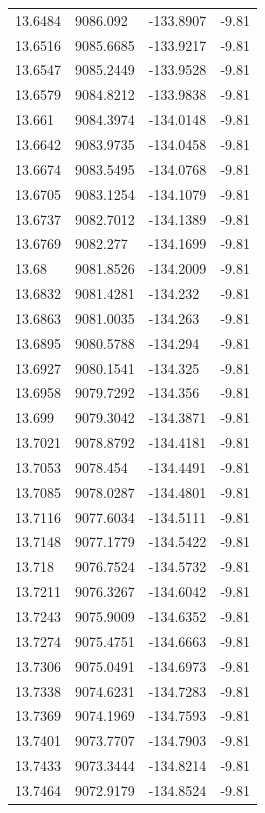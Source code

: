 \begin{table}[H]
\begin{tabular}{llll}
13.6484 & 9086.092 & -133.8907 & -9.81 \\
13.6516 & 9085.6685 & -133.9217 & -9.81 \\
13.6547 & 9085.2449 & -133.9528 & -9.81 \\
13.6579 & 9084.8212 & -133.9838 & -9.81 \\
13.661 & 9084.3974 & -134.0148 & -9.81 \\
13.6642 & 9083.9735 & -134.0458 & -9.81 \\
13.6674 & 9083.5495 & -134.0768 & -9.81 \\
13.6705 & 9083.1254 & -134.1079 & -9.81 \\
13.6737 & 9082.7012 & -134.1389 & -9.81 \\
13.6769 & 9082.277 & -134.1699 & -9.81 \\
13.68 & 9081.8526 & -134.2009 & -9.81 \\
13.6832 & 9081.4281 & -134.232 & -9.81 \\
13.6863 & 9081.0035 & -134.263 & -9.81 \\
13.6895 & 9080.5788 & -134.294 & -9.81 \\
13.6927 & 9080.1541 & -134.325 & -9.81 \\
13.6958 & 9079.7292 & -134.356 & -9.81 \\
13.699 & 9079.3042 & -134.3871 & -9.81 \\
13.7021 & 9078.8792 & -134.4181 & -9.81 \\
13.7053 & 9078.454 & -134.4491 & -9.81 \\
13.7085 & 9078.0287 & -134.4801 & -9.81 \\
13.7116 & 9077.6034 & -134.5111 & -9.81 \\
13.7148 & 9077.1779 & -134.5422 & -9.81 \\
13.718 & 9076.7524 & -134.5732 & -9.81 \\
13.7211 & 9076.3267 & -134.6042 & -9.81 \\
13.7243 & 9075.9009 & -134.6352 & -9.81 \\
13.7274 & 9075.4751 & -134.6663 & -9.81 \\
13.7306 & 9075.0491 & -134.6973 & -9.81 \\
13.7338 & 9074.6231 & -134.7283 & -9.81 \\
13.7369 & 9074.1969 & -134.7593 & -9.81 \\
13.7401 & 9073.7707 & -134.7903 & -9.81 \\
13.7433 & 9073.3444 & -134.8214 & -9.81 \\
13.7464 & 9072.9179 & -134.8524 & -9.81 \\

\end{tabular}
\end{table}
